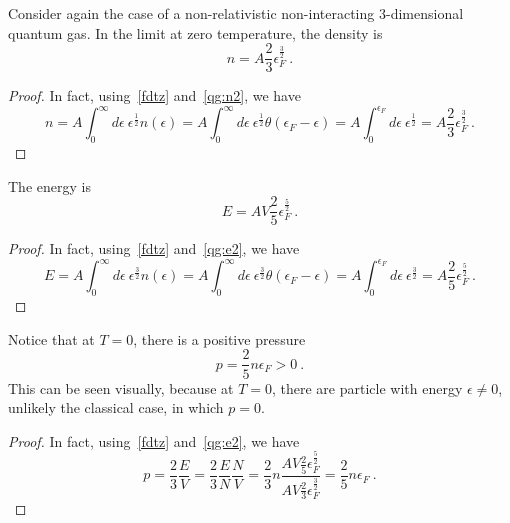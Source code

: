     Consider again the case of a non-relativistic non-interacting $3$-dimensional quantum gas. In the limit at zero temperature, the density is
    \begin{equation*}
        n = A \frac{2}{3} \epsilon_F^{\frac{3}{2}} ~.
    \end{equation*}
    \begin{proof}
        In fact, using~\eqref{fdtz} and~\eqref{qg:n2}, we have
        \begin{equation*}
            n = A \int_0^\infty d\epsilon ~ \epsilon^{\frac{1}{2}} n(\epsilon) = A \int_0^{\infty} d\epsilon ~ \epsilon^{\frac{1}{2}} \theta(\epsilon_F - \epsilon) = A \int_0^{\epsilon_F} d\epsilon ~ \epsilon^{\frac{1}{2}} = A \frac{2}{3} \epsilon_F^{\frac{3}{2}} ~.
        \end{equation*}
    \end{proof}
    The energy is 
    \begin{equation*}
        E = A V \frac{2}{5} \epsilon_F^{\frac{5}{2}} ~.
    \end{equation*}
    \begin{proof}
        In fact, using~\eqref{fdtz} and~\eqref{qg:e2}, we have
        \begin{equation*}
            E  = A \int_0^\infty d\epsilon ~ \epsilon^{\frac{3}{2}} n(\epsilon) = A \int_0^\infty d\epsilon ~ \epsilon^{\frac{3}{2}} \theta(\epsilon_F - \epsilon) = A \int_0^{\epsilon_F} d\epsilon ~ \epsilon^{\frac{3}{2}} = A \frac{2}{5} \epsilon_F^{\frac{5}{2}} ~.
        \end{equation*}
    \end{proof}
    Notice that at $T = 0$, there is a positive pressure 
    \begin{equation*}
        p = \frac{2}{5} n \epsilon_F > 0~.
    \end{equation*}
    This can be seen visually, because at $T=0$, there are particle with energy $\epsilon \neq 0$, unlikely the classical case, in which $p = 0$.
    \begin{proof}
        In fact, using~\eqref{fdtz} and~\eqref{qg:e2}, we have
        \begin{equation*}
            p = \frac{2}{3} \frac{E}{V} = \frac{2}{3} \frac{E}{N} \frac{N}{V} = \frac{2}{3} n \frac{A V \frac{2}{5} \epsilon_F^{\frac{5}{2}}}{A V\frac{2}{3} \epsilon_F^{\frac{3}{2}}} = \frac{2}{5} n \epsilon_F ~. 
        \end{equation*}
    \end{proof}

